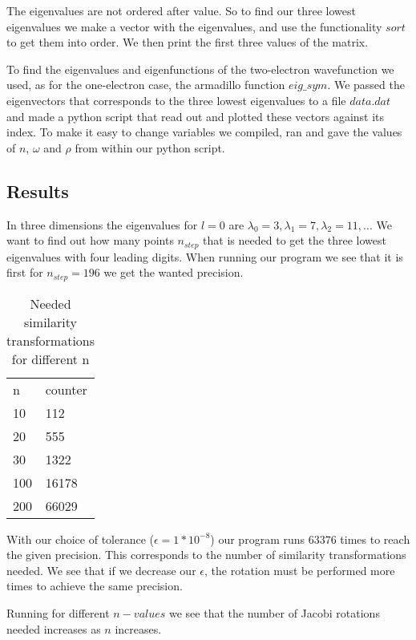 \documentclass[a4paper,12pt, english]{article}
\begin{document}
The eigenvalues are not ordered after value. So to find our three lowest eigenvalues we make a vector with the eigenvalues, and use the functionality $sort$ to get them into order. We then print the first three values of the matrix.

To find the eigenvalues and eigenfunctions of the two-electron wavefunction we used, as for the one-electron case, the armadillo function $eig\_sym$. We passed the eigenvectors that corresponds to the three lowest eigenvalues to a file $data.dat$ and made a python script that read out and plotted these vectors against its index. To make it easy to change variables we compiled, ran and gave the values of $n$, $\omega$ and $\rho$ from within our python script.    
 



  

\subsection{Results}

In three dimensions the eigenvalues for $l=0$ are $\lambda_0 = 3, \lambda_1 = 7, \lambda_2 = 11,...$ We want to find out how many points $n_{step}$ that is needed to get the three lowest eigenvalues with four leading digits. When running our program we see that it is first for $n_{step} = 196$ we get the wanted precision. 

\begin{table} [h!]
\caption{Needed similarity transformations for different n}
\centering
\begin{tabular}{l |  l }
n & counter \\
10 & 112   \\
20 & 555 \\
30 & 1322 \\
100 & 16178 \\
200 & 66029 \\
\end{tabular}
\end{table}
 
With our choice of tolerance ($\epsilon = 1*10^{-8}$) our program runs $63376$ times to reach the given precision. This corresponds to the number of similarity transformations needed. We see that if we decrease our $\epsilon$, the rotation must be performed more times to achieve the same precision. 

Running for different $n-values$ we see that the number of Jacobi rotations needed increases as $n$ increases. 
\end{document}
